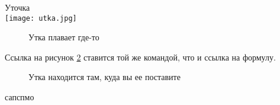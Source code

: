 \documentclass[12pt]{article}
\begin{document}
Уточка \\
\texttt{[image: utka.jpg]}

\begin{figure}[h] %
\caption{Утка плавает где-то}
\label{ут}
\end{figure}


Ссылка на рисунок \ref{ут} ставится той же командой, что и ссылка на формулу.

\begin{figure}[H] %
\caption{Утка находится там, куда вы ее поставите}
\label{ут}
\end{figure}
\newpage

\begin{thebibliography}{0}
сапспмо
\end{thebibliography}
\end{document}
